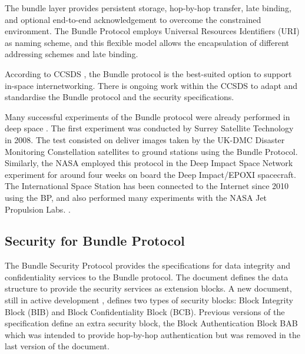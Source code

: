 The bundle layer provides persistent storage, hop-by-hop transfer, late binding, and optional end-to-end acknowledgement to overcome the constrained environment. The Bundle Protocol employs Universal Resources Identifiers (URI) as naming scheme, and this flexible model allows the encapsulation of different addressing schemes and late binding. 

According to CCSDS \cite{rationale2010requirements}, the Bundle protocol is the best-suited option to support in-space internetworking. There is ongoing work within the CCSDS to adapt and standardise the Bundle protocol and the security specifications. %

Many successful experiments of the Bundle protocol were already performed in deep space  \cite{ivancic2010experience}. The first experiment was conducted by Surrey Satellite Technology in 2008. The test consisted on deliver images taken by the UK-DMC Disaster Monitoring Constellation satellites to ground stations using the Bundle Protocol. Similarly, the NASA employed this protocol in the Deep Impact Space Network experiment for around four weeks on board the Deep Impact/EPOXI spacecraft. The International Space Station has been connected to the Internet since 2010 using the BP, and also performed many experiments with the NASA Jet Propulsion Labs. \cite{araniti2015contact}.    


\subsection{Security for Bundle Protocol}


 
 
The Bundle Security Protocol \cite{rfc6257} provides the specifications for data integrity and confidentiality services to the Bundle protocol. The document defines the data structure to provide the security services as extension blocks. A new document, still in active development \cite{ietf-dtn-bpsec-07}, defines two types of security blocks: Block Integrity Block (BIB) and Block Confidentiality Block (BCB). Previous versions of the specification define an extra security block, the Block Authentication Block BAB which was intended to provide hop-by-hop authentication but was removed in the last version of the document.     
 

